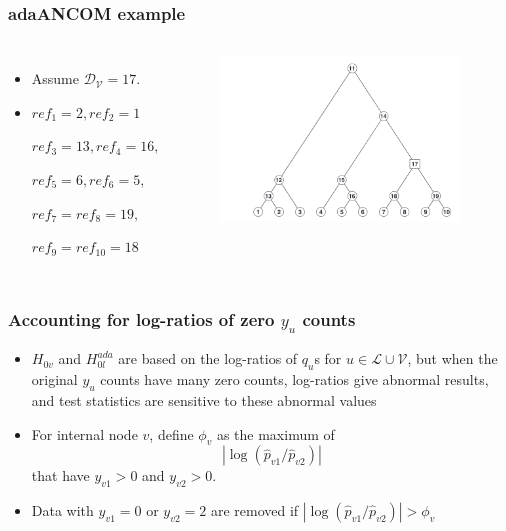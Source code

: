 \documentclass{beamer}
\begin{document}
\begin{frame}
\frametitle{adaANCOM example}

\begin{columns}[c] %

\begin{itemize}
  \item Assume $\mathcal{D}_{\mathcal{V}} = 17$.
  \item $ref_1 = 2, ref_2 = 1$

  $ ref_3 = 13, ref_4 = 16, $

  $ref_5 = 6, ref_6 = 5,$

  $ ref_7 = ref_8 = 19, $

  $ref_9 = ref_{10} = 18$
\end{itemize}

\begin{figure}[!htb]
	\centering
	\includegraphics[width=0.95\textwidth]{img/ex2.png}
\end{figure}

\end{columns}
\end{frame}
\begin{frame}
\frametitle{Accounting for log-ratios of zero $y_u$ counts}
\begin{itemize}
  \item $H_{0v}$ and $H_{0l}^{ada}$ are based on the log-ratios of $q_u$s for $u \in \mathcal{L} \cup \mathcal{V}$, but when the original $y_u$ counts have many zero counts, log-ratios give abnormal results, and test statistics are sensitive to these abnormal values
  \item For internal node $v$, define $\phi_v $ as the maximum of $$|\log(\hat p_{v1}/\hat p_{v2})|$$  that have $y_{v1} > 0$ and $y_{v2} > 0$.
  \item Data with $y_{v1} = 0$ or $y_{v2} = 2$ are removed if $|\log(\hat p_{v1}/\hat p_{v2})| > \phi_v$
\end{itemize}
\end{frame}
\end{document}
